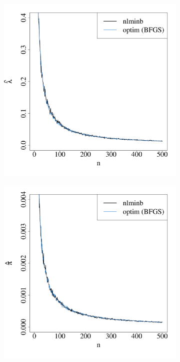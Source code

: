 \documentclass[nojss]{jss}
\begin{document}
\begin{appendix}
\begin{figure}[h]
  \vspace{-20pt}
  \centering
    \begin{subfigure}[h]{0.49\textwidth}
        \includegraphics[width=\textwidth]{article-varZIPa}
        \caption{\label{fig:varZIPa}}
    \end{subfigure}
    \begin{subfigure}[h]{0.49\textwidth}
        \includegraphics[width=\textwidth]{article-varZIPb}

\end{subfigure}
\end{figure}
\end{appendix}
\end{document}
